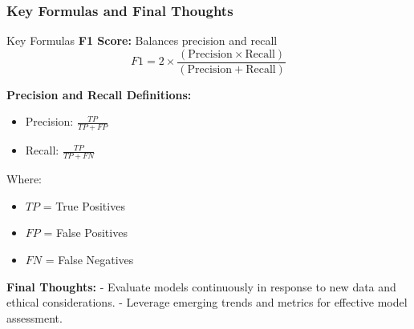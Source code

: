 \documentclass[aspectratio=169]{beamer}
\begin{document}
\begin{frame}[fragile]
    \frametitle{Key Formulas and Final Thoughts}
    \begin{block}{Key Formulas}
        \textbf{F1 Score:} Balances precision and recall
        \begin{equation}
            F1 = 2 \times \frac{(\text{Precision} \times \text{Recall})}{(\text{Precision} + \text{Recall})}
        \end{equation}

        \textbf{Precision and Recall Definitions:}
        \begin{itemize}
            \item Precision: \( \frac{TP}{TP + FP} \)
            \item Recall: \( \frac{TP}{TP + FN} \)
        \end{itemize}
        Where:
        \begin{itemize}
            \item \( TP \) = True Positives
            \item \( FP \) = False Positives
            \item \( FN \) = False Negatives
        \end{itemize}
    \end{block}

    \textbf{Final Thoughts:}
    - Evaluate models continuously in response to new data and ethical considerations.
    - Leverage emerging trends and metrics for effective model assessment.
\end{frame}
\end{document}
